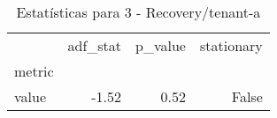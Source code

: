 \begin{table}[htbp]
\caption{Estatísticas para 3 - Recovery/tenant-a}
\label{tab:3_-_recovery_tenant-a_adf_test}
\begin{tabular}{lrrr}
\toprule
 & adf_stat & p_value & stationary \\
metric &  &  &  \\
\midrule
value & -1.52 & 0.52 & False \\
\bottomrule
\end{tabular}
\end{table}
